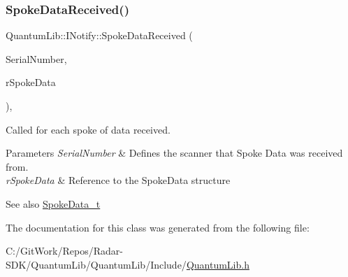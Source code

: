 \subsubsection{\texorpdfstring{Spoke\+Data\+Received()}{SpokeDataReceived()}}
{\footnotesize\ttfamily Quantum\+Lib\+::\+I\+Notify\+::\+Spoke\+Data\+Received (\begin{DoxyParamCaption}\item[{uint32\+\_\+t}]{Serial\+Number,  }\item[{\mbox{\hyperlink{struct_quantum_lib_1_1_spoke_data__t}{Spoke\+Data\+\_\+t}} \&}]{r\+Spoke\+Data }\end{DoxyParamCaption})\hspace{0.3cm}{\ttfamily [inline]}, {\ttfamily [virtual]}}

Called for each spoke of data received. 
\begin{DoxyParams}{Parameters}
{\em Serial\+Number} & Defines the scanner that Spoke Data was received from. \\
\hline
{\em r\+Spoke\+Data} & Reference to the Spoke\+Data structure \\
\hline
\end{DoxyParams}
\begin{DoxySeeAlso}{See also}
\mbox{\hyperlink{struct_quantum_lib_1_1_spoke_data__t}{Spoke\+Data\+\_\+t}} 
\end{DoxySeeAlso}


The documentation for this class was generated from the following file\+:\begin{DoxyCompactItemize}
\item 
C\+:/\+Git\+Work/\+Repos/\+Radar-\/\+S\+D\+K/\+Quantum\+Lib/\+Quantum\+Lib/\+Include/\mbox{\hyperlink{_quantum_lib_8h}{Quantum\+Lib.\+h}}\end{DoxyCompactItemize}

